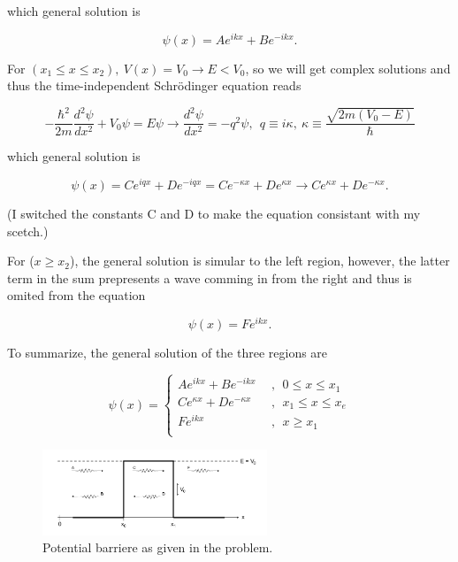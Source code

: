 \documentclass{article}
\begin{document}
which general solution is

\begin{equation}
\psi(x) = Ae^{ikx} + Be^{-ikx}.
\end{equation}

For $(x_1 \leq x \leq x_2), \ V(x) = V_0 \rightarrow E < V_0$, so we will get complex solutions and thus the time-independent Schrödinger equation reads

\begin{equation}
-\frac{\hbar^2}{2m}\frac{d^2\psi}{dx^2} + V_0\psi = E\psi \rightarrow \frac{d^2\psi}{dx^2} = -q^2\psi, \ \ q \equiv i\kappa, \ \kappa \equiv \frac{\sqrt{2m(V_0 - E)}}{\hbar}
\end{equation}

which general solution is

\begin{equation}
\psi(x) = Ce^{iqx} + De^{-iqx} = Ce^{-\kappa x} + De^{\kappa x} \rightarrow Ce^{\kappa x} + De^{-\kappa x}.
\end{equation}

(I switched the constants C and D to make the equation consistant with my scetch.)

For ($x \geq x_2$), the general solution is simular to the left region, however, the latter term in the sum prepresents a wave comming in from the right and thus is omited from the equation

\begin{equation}
\psi(x) = Fe^{ikx}.
\end{equation}

To summarize, the general solution of the three regions are

\begin{equation}
\psi(x) = \begin{cases}
Ae^{ikx} + Be^{-ikx} \ \ &, \ \ 0 \leq x \leq x_1 \\
Ce^{\kappa x} + De^{-\kappa x} \ \ &, \ \ x_1 \leq x \leq x_e \\
Fe^{ikx}  &, \ \ x \geq x_1 \\
\end{cases}
\end{equation}


\begin{figure}[t]
\centering
\includegraphics[width=0.6\textwidth]{potentialbarriere}
\caption{Potential barriere as given in the problem.}
\label{fig:figure_label}
\end{figure}
\end{document}
